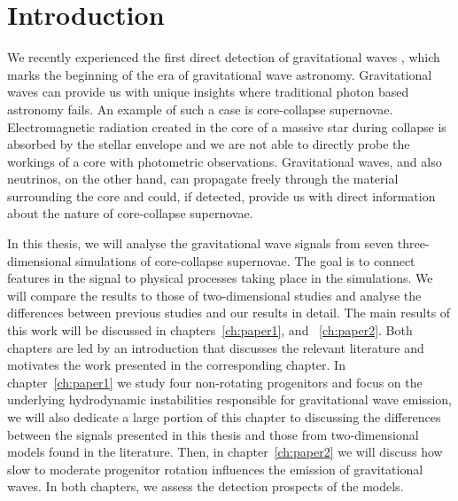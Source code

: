 \chapter{Introduction}
We recently experienced the first direct detection of gravitational waves \citep{gw_detect},
which marks the beginning of the era of gravitational wave astronomy. Gravitational waves can provide us with 
unique insights where traditional photon based astronomy fails. An example of such a case is core-collapse supernovae. 
Electromagnetic radiation created in the core of a massive star during collapse is absorbed by the stellar
envelope and we are not able to directly probe the workings of a core with 
photometric observations. Gravitational waves, and also neutrinos, on the other hand, can
propagate freely through the material surrounding the core and could, if detected, provide us with
direct information about the nature of core-collapse supernovae.

In this thesis, we will analyse the gravitational wave signals
from seven three-dimensional simulations of core-collapse supernovae. 
The goal is to connect features in the signal
to physical processes taking place in the simulations. We will compare the results to
those of two-dimensional studies and analyse the differences between previous studies and our results in detail.
The main results of this work will be discussed in chapters~\ref{ch:paper1}, and ~\ref{ch:paper2}. 
Both chapters are led by an introduction that discusses the relevant literature and motivates the work presented in
the corresponding chapter.
In chapter~\ref{ch:paper1} we study four non-rotating progenitors and focus on the
underlying hydrodynamic instabilities responsible for gravitational wave emission,
we will also dedicate a large portion of this chapter to discussing the differences between
the signals presented in this thesis and those from two-dimensional models found in the literature.
Then, in chapter~\ref{ch:paper2} we will discuss how slow to moderate progenitor rotation influences the emission of
gravitational waves. In both chapters, we assess the detection prospects of the models.

